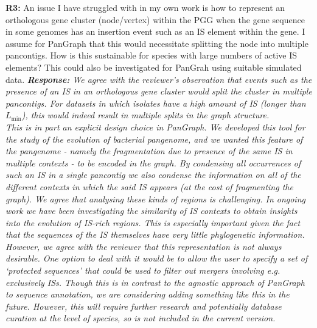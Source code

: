 \documentclass[aps,rmp,onecolumn]{revtex4-1}
\newcommand{\Lthr}{L_{\min}}
\newcommand{\Marco}[1]{{\color{orange}Marco: #1}}
\newcommand{\Liam}[1]{{\color{teal}Liam: #1}}
\newcommand{\reviewer}[2]{\textbf{#1:} #2\vskip 5mm}
\newcommand{\response}[1]{{\it {\color{response}\textbf{Response:} #1}}\vskip 5mm}
\begin{document}
\reviewer{R3}{An issue I have struggled with in my own work is how to represent an orthologous gene cluster (node/vertex) within the PGG when the gene sequence in some genomes has an insertion event such as an IS element within the gene. I assume for PanGraph that this would necessitate splitting the node into multiple pancontigs. How is this sustainable for species with large numbers of active IS elements? This could also be investigated for PanGrah using suitable simulated data.}
\response{
      We agree with the reviewer's observation that events such as the presence of an IS in an orthologous gene cluster would split the cluster in multiple pancontigs. 
      For datasets in which isolates have a high amount of IS (longer than $\Lthr$), this would indeed result in multiple splits in the graph structure.\\
      This is in part an explicit design choice in \textit{PanGraph}. We developed this tool for the study of the evolution of bacterial pangenome, and we wanted this feature of the pangenome - namely the fragmentation due to presence of the same IS in multiple contexts - to be encoded in the graph. 
      By condensing all occurrences of such an IS in a single pancontig we also condense the information on all of the different contexts in which the said IS appears (at the cost of fragmenting the graph). We agree that analysing these kinds of regions is challenging. In ongoing work we have been investigating the similarity of IS contexts to obtain insights into the evolution of IS-rich regions. This is especially important given the fact that the sequences of the IS themselves have very little phylogenetic information.\\
      However, we agree with the reviewer that this representation is not always desirable. One option to deal with it would be to allow the user to specify a set of `protected sequences' that could be used to filter out mergers involving e.g. exclusively ISs. Though this is in contrast to the agnostic approach of \textit{PanGraph} to sequence annotation, we are considering adding something like this in the future. However, this will require further research and potentially database curation at the level of species, so is not included in the current version.
}


{}
\end{document}

